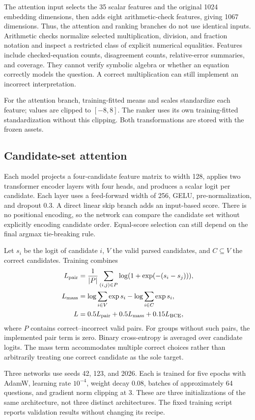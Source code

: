 \documentclass[11pt]{article}
\begin{document}
The attention input selects the 35 scalar features and the original 1024 embedding dimensions, then adds eight arithmetic-check features, giving 1067 dimensions. Thus, the attention and ranking branches do not use identical inputs. Arithmetic checks normalize selected multiplication, division, and fraction notation and inspect a restricted class of explicit numerical equalities. Features include checked-equation counts, disagreement counts, relative-error summaries, and coverage. They cannot verify symbolic algebra or whether an equation correctly models the question. A correct multiplication can still implement an incorrect interpretation.

For the attention branch, training-fitted means and scales standardize each feature; values are clipped to $[-8,8]$. The ranker uses its own training-fitted standardization without this clipping. Both transformations are stored with the frozen assets.

\subsection{Candidate-set attention}
Each model projects a four-candidate feature matrix to width 128, applies two transformer encoder layers with four heads, and produces a scalar logit per candidate. Each layer uses a feed-forward width of 256, GELU, pre-normalization, and dropout 0.3. A direct linear skip branch adds an input-based score. There is no positional encoding, so the network can compare the candidate set without explicitly encoding candidate order. Equal-score selection can still depend on the final argmax tie-breaking rule.

Let $s_i$ be the logit of candidate $i$, $V$ the valid parsed candidates, and $C\subseteq V$ the correct candidates. Training combines
\begin{align}
L_{\rm pair}&=\frac{1}{|P|}\sum_{(i,j)\in P}\log(1+\exp(-(s_i-s_j))),\\
L_{\rm mass}&=\log\sum_{i\in V}\exp s_i-\log\sum_{i\in C}\exp s_i,\\
L&=0.5L_{\rm pair}+0.5L_{\rm mass}+0.15L_{\rm BCE},
\end{align}
where $P$ contains correct--incorrect valid pairs. For groups without such pairs, the implemented pair term is zero. Binary cross-entropy is averaged over candidate logits. The mass term accommodates multiple correct choices rather than arbitrarily treating one correct candidate as the sole target.

Three networks use seeds 42, 123, and 2026. Each is trained for five epochs with AdamW, learning rate $10^{-4}$, weight decay 0.08, batches of approximately 64 questions, and gradient norm clipping at 3. These are three initializations of the same architecture, not three distinct architectures. The fixed training script reports validation results without changing its recipe.
\end{document}
